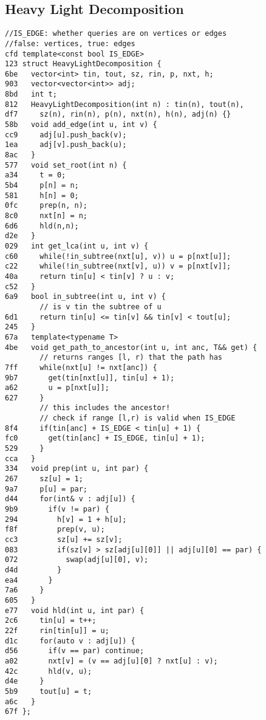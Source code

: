 \documentclass[10pt, a4paper, twoside]{article}
\begin{document}
\subsection{Heavy Light Decomposition}
\begin{lstlisting}
//IS_EDGE: whether queries are on vertices or edges
//false: vertices, true: edges
cfd template<const bool IS_EDGE>
123 struct HeavyLightDecomposition {
6be   vector<int> tin, tout, sz, rin, p, nxt, h;
903   vector<vector<int>> adj;
8bd   int t;
812   HeavyLightDecomposition(int n) : tin(n), tout(n),
df7     sz(n), rin(n), p(n), nxt(n), h(n), adj(n) {}
58b   void add_edge(int u, int v) {
cc9     adj[u].push_back(v);
1ea     adj[v].push_back(u);
8ac   }
577   void set_root(int n) {
a34     t = 0;
5b4     p[n] = n;
581     h[n] = 0;
0fc     prep(n, n);
8c0     nxt[n] = n;
6d6     hld(n,n);
d2e   }
029   int get_lca(int u, int v) {
c60     while(!in_subtree(nxt[u], v)) u = p[nxt[u]];
c22     while(!in_subtree(nxt[v], u)) v = p[nxt[v]];
40a     return tin[u] < tin[v] ? u : v;
c52   }
6a9   bool in_subtree(int u, int v) {
        // is v tin the subtree of u
6d1     return tin[u] <= tin[v] && tin[v] < tout[u];
245   }
67a   template<typename T>
4be   void get_path_to_ancestor(int u, int anc, T&& get) {
        // returns ranges [l, r) that the path has
7ff     while(nxt[u] != nxt[anc]) {
9b7       get(tin[nxt[u]], tin[u] + 1);
a62       u = p[nxt[u]];
627     }
        // this includes the ancestor!
        // check if range [l,r) is valid when IS_EDGE
8f4     if(tin[anc] + IS_EDGE < tin[u] + 1) {
fc0       get(tin[anc] + IS_EDGE, tin[u] + 1);
529     }
cca   }
334   void prep(int u, int par) {
267     sz[u] = 1;
9a7     p[u] = par;
d44     for(int& v : adj[u]) {
9b9       if(v != par) {
294         h[v] = 1 + h[u];
f8f         prep(v, u);
cc3         sz[u] += sz[v];
083         if(sz[v] > sz[adj[u][0]] || adj[u][0] == par) {
072           swap(adj[u][0], v);
d4d         }
ea4       }
7a6     }
605   }
e77   void hld(int u, int par) {
2c6     tin[u] = t++;
22f     rin[tin[u]] = u;
d1c     for(auto v : adj[u]) {
d56       if(v == par) continue;
a02       nxt[v] = (v == adj[u][0] ? nxt[u] : v);
42c       hld(v, u);
d4e     }
5b9     tout[u] = t;
a6c   }
67f };
\end{lstlisting}
\end{document}
